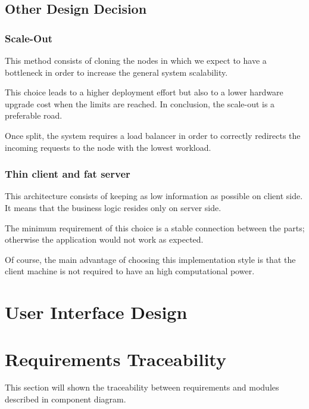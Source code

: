 \documentclass[table, 12pt]{article}
\begin{document}
\subsection{Other Design Decision}
\subsubsection{Scale-Out}
This method consists of cloning the nodes in which we expect to have a bottleneck in order to increase the general system scalability.

This choice leads to a higher deployment effort but also to a lower hardware upgrade cost when the limits are reached. In conclusion, the scale-out is a preferable road.

Once split, the system requires a load balancer in order to correctly redirects the incoming requests to the node with the lowest workload.

\subsubsection{Thin client and fat server}
This architecture consists of keeping as low information as possible on client side. It means that the business logic resides only on server side.

The minimum requirement of this choice is a stable connection between the parts; otherwise the application would not work as expected.

Of course, the main advantage of choosing this implementation style is that the client machine is not required to have an high computational power.

\section{User Interface Design}

\section{Requirements Traceability}
This section will shown the traceability between requirements and modules described in component diagram.
\end{document}
